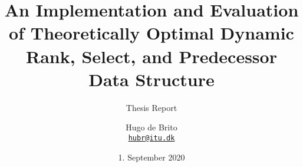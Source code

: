 
\titlehead{
    \texttt{[image: 03\_GraphicFiles/logo\_en.png]}
}

\subject{MSc Software Development}

\title{An Implementation and Evaluation of Theoretically Optimal Dynamic Rank, Select, and Predecessor Data Structure}

\subtitle{Thesis Report}

\author{Hugo de Brito\\
\href{mailto:hubr@itu.dk}{{\tt hubr@itu.dk}}}

\date{1. September 2020}

\publishers{{\small Supervisor}\\Holger Dell\\
\href{mailto:hold@itu.dk}{{\tt hold@itu.dk}}}

\maketitle